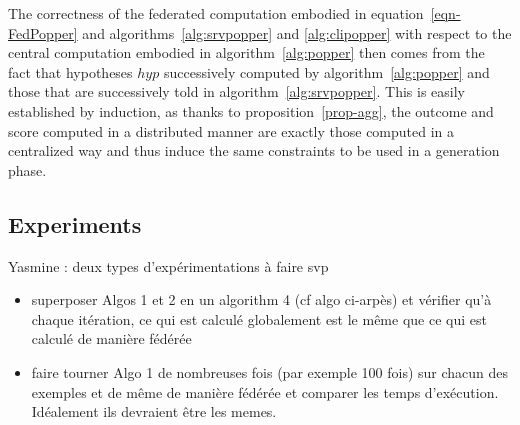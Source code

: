 The correctness of the federated computation embodied in equation~\ref{eqn-FedPopper} and algorithms~\ref{alg:srvpopper} and \ref{alg:clipopper} with respect to the central computation embodied in algorithm~\ref{alg:popper} then comes from the fact that hypotheses $hyp$ successively computed by algorithm~\ref{alg:popper} and those that are successively told in algorithm~\ref{alg:srvpopper}. This is easily established by induction, as thanks to proposition~\ref{prop-agg}, the outcome and score computed in a distributed manner are exactly those computed in a centralized way and thus induce the same constraints to be used in a generation phase.


\subsection{Experiments}

Yasmine : deux types d'expérimentations à faire svp

\begin{itemize}

\item superposer Algos 1 et 2 en un algorithm 4 (cf algo ci-arpès) et vérifier qu'à chaque itération, ce qui est calculé globalement est le même que ce qui est calculé de manière fédérée

\item faire tourner Algo 1 de nombreuses fois (par exemple 100 fois) sur chacun des exemples et de même de manière fédérée et comparer les temps d'exécution. Idéalement ils devraient être les memes.

\end{itemize}


